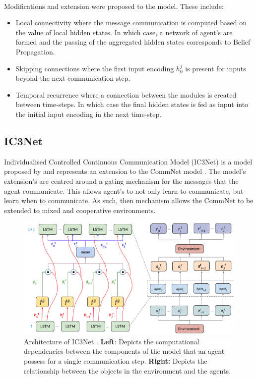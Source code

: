 \documentclass{article}
\begin{document}
\

Modifications and extension were proposed to the model. These include:
\begin{itemize}
	\item Local connectivity where the message communication is computed based on the value of local hidden states. In which case, a network of agent's are formed and the passing of the aggregated hidden states corresponds to Belief Propagation. \citep{pearl1982bayes}
	\item Skipping connections where the first input encoding $h_0^j$ is present for inputs beyond the next communication step.
	\item Temporal recurrence where a connection between the modules is created between time-steps. In which case the final hidden states is fed as input into the initial input encoding in the next time-step. 
\end{itemize}

\subsection{IC3Net}

Individualised Controlled Continuous Communication Model (IC3Net) is a model proposed by \citet{singh2018ic3net} and represents an extension to the CommNet model \citep{sukhbaatar2016commnet}. The model's extension's are centred around a gating mechanism for the messages that the agent communicate. This allows agent's to not only learn to communicate, but learn when to communicate. As such, then mechanism allows the CommNet \citep{sukhbaatar2016commnet} to be extended to mixed and cooperative environments. 

\begin{figure}
	\centering
	\includegraphics[scale=0.5]{images/ic3net.png}
	\caption{Architecture of IC3Net \citep{singh2018ic3net}. \textbf{Left}: Depicts the computational dependencies between the components of the model that an agent possess for a single communication step. \textbf{Right:} Depicts the relationship between the objects in the environment and the agents.}
	\label{fig:ic3net.png}
\end{figure}
\end{document}
